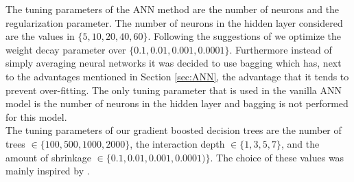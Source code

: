 The tuning parameters of the ANN method are the number of neurons and the regularization parameter. The number of neurons in the hidden layer  considered are the values in $\{ 5,10,20,40,60 \}$. Following the suggestions of \cite{venables_modern_2002} we optimize the weight decay parameter over $\{0.1,0.01,0.001,0.0001\}$. Furthermore instead of simply averaging neural networks it was decided to use bagging which has, next to the advantages mentioned in Section \ref{sec:ANN}, the advantage that it tends to prevent over-fitting. The only tuning parameter that is used in the vanilla ANN model is the number of neurons in the hidden layer and bagging is not performed for this model. \\

The tuning parameters of our gradient boosted decision trees are the number of trees $\in \{ 100,500,1000,2000\}$, the interaction depth $\in \{ 1,3,5,7\}$, and the amount of shrinkage $\in  \{0.1,0.01,0.001,0.0001)\}$. The choice of these values was mainly inspired by \cite{elith_working_2008}. \\